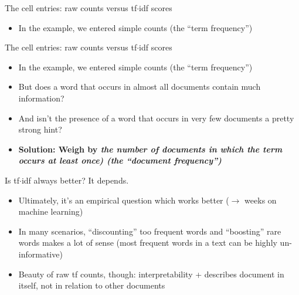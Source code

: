 

\begin{frame}{The cell entries: raw counts versus tf$\cdot$idf scores}
\begin{itemize}
	\item In the example, we entered simple counts (the ``term frequency'')
\end{itemize}
\end{frame}



\begin{frame}{The cell entries: raw counts versus tf$\cdot$idf scores}
	\begin{itemize}
		\item In the example, we entered simple counts (the ``term frequency'')
		\item But does a word that occurs in almost all documents contain much information?
		\item And isn't the presence of a word that occurs in very few documents a pretty strong hint?
		\item<2-> \textbf{Solution: Weigh by \emph{the number of documents in which the term occurs at least once) (the ``document frequency'')}} 
	\end{itemize}
\end{frame}

\begin{frame}{Is tf$\cdot$idf always better?}
It depends.

\begin{itemize}
	\item Ultimately, it's an empirical question which works better ($\rightarrow$ weeks on machine learning)
	\item In many scenarios,  ``discounting'' too frequent words and ``boosting'' rare words makes a lot of sense (most frequent words in a text can be highly un-informative)
	\item Beauty of raw tf counts, though: interpretability + describes document in itself, not in relation to other documents
\end{itemize}
\end{frame}


